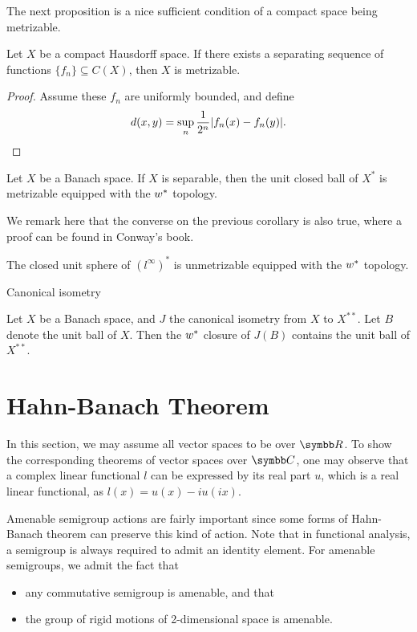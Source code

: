The next proposition is a nice sufficient condition of a compact space being metrizable.

\begin{proposition}
  Let $X$ be a compact Hausdorff space. If there exists a separating sequence of functions $\{f_n\}\subseteq C(X)$, then $X$ is metrizable.
\end{proposition}

\begin{proof}
  Assume these $f_n$ are uniformly bounded, and define
  \begin{equation*}
    d(x, y)=\sup_{n} \frac{1}{2^n}\vert f_n(x)-f_n(y)\vert.
  \end{equation*}
\end{proof}

\begin{corollary}
  Let $X$ be a Banach space. If $X$ is separable, then the unit closed ball of $X^*$ is metrizable equipped with the $w^*$ topology.
\end{corollary}

We remark here that the converse on the previous corollary is also true, where a proof can be found in Conway's book.

\begin{example}
  The closed unit sphere of $(l^\infty)^*$ is unmetrizable equipped with the $w^*$ topology.
\end{example}

Canonical isometry

\begin{proposition}[Goldstein?]
  Let $X$ be a Banach space, and $J$ the canonical isometry from $X$ to $X^{**}$. Let $B$ denote the unit ball of $X$. Then the $w^*$ closure of $J(B)$ contains the unit ball of $X^{**}$.
\end{proposition}

\section{Hahn-Banach Theorem}

In this section, we may assume all vector spaces to be over $\RR$. To show the corresponding theorems of vector spaces over $\CC$, one may observe that a complex linear functional $l$ can be expressed by its real part $u$, which is a real linear functional, as $l(x)=u(x)-iu(ix)$.

Amenable semigroup actions are fairly important since some forms of Hahn-Banach theorem can preserve this kind of action. Note that in functional analysis, a semigroup is always required to admit an identity element. For amenable semigroups, we admit the fact that
\begin{itemize}
  \item any commutative semigroup is amenable, and that
  \item the group of rigid motions of 2-dimensional space is amenable.
\end{itemize}


